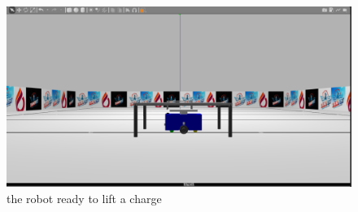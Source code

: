 \documentclass[a4paper,12pt]{extreport}
\begin{document}
\begin{figure}[h!]
\centering
\includegraphics[width=\textwidth]{img/image057.png}
\caption{the robot ready to lift a charge}
\end{figure}
\end{document}

